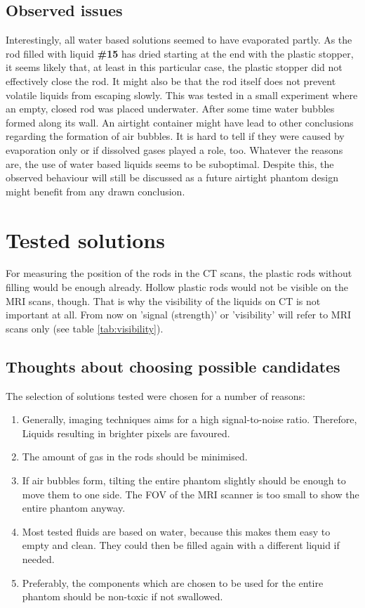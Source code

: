 \subsection{Observed issues}

Interestingly, all water based solutions seemed to have evaporated partly.
As the rod filled with liquid \textbf{\#15} has dried starting at the end with the plastic stopper, it seems likely that, at least in this particular case, the plastic stopper did not effectively close the rod.
It might also be that the rod itself does not prevent volatile liquids from escaping slowly.
This was tested in a small experiment where an empty, closed rod was placed underwater.
After some time water bubbles formed along its wall.
An airtight container might have lead to other conclusions regarding the formation of air bubbles.
It is hard to tell if they were caused by evaporation only or if dissolved gases played a role, too.
Whatever the reasons are, the use of water based liquids seems to be suboptimal.
Despite this, the observed behaviour will still be discussed as a future airtight phantom design might benefit from any drawn conclusion.

\section{Tested solutions}

For measuring the position of the rods in the CT scans, the plastic rods without filling would be enough already.
Hollow plastic rods would not be visible on the MRI scans, though.
That is why the visibility of the liquids on CT is not important at all.
From now on 'signal (strength)' or 'visibility' will refer to MRI scans only (see table \ref{tab:visibility}).

\subsection{Thoughts about choosing possible candidates}

The selection of solutions tested were chosen for a number of reasons:
\begin{enumerate}[label=\textbf{\arabic*.}]
\item Generally, imaging techniques aims for a high signal-to-noise ratio. Therefore, Liquids resulting in brighter pixels are favoured.
\item The amount of gas in the rods should be minimised.
\item If air bubbles form, tilting the entire phantom slightly should be enough to move them to one side. The FOV of the MRI scanner is too small to show the entire phantom anyway.
\item Most tested fluids are based on water, because this makes them easy to empty and clean.
They could then be filled again with a different liquid if needed.
\item Preferably, the components which are chosen to be used for the entire phantom should be non-toxic if not swallowed.
\end{enumerate}

